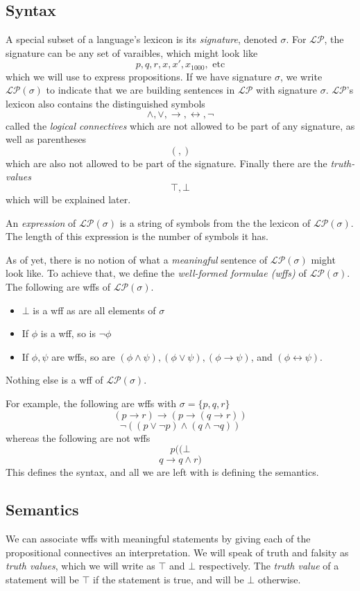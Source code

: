 \documentclass[12pt]{article}
\begin{document}
\subsection*{Syntax}
A special subset of a language's lexicon is its \emph{signature}, denoted $\sigma$. For $\mathcal{LP}$, the signature can be any set of varaibles, which might look like
\[
  p, q, r, x, x', x_{1000}, \text{ etc}
\]
which we will use to express propositions. If we have signature $\sigma$, we write $\mathcal{LP}(\sigma)$ to indicate that we are building sentences in $\mathcal{LP}$ with signature $\sigma$. $\mathcal{LP}$'s lexicon also contains the distinguished symbols
\[
  \land, \vee, \rightarrow,  \leftrightarrow, \lnot
\]
called the \emph{logical connectives} which are not allowed to be part of any signature, as well as parentheses 
\[
  (, )
\]
which are also not allowed to be part of the signature. Finally there are the \emph{truth-values}
\[
  \top, \bot
\]
which will be explained later. 

An \emph{expression} of $\mathcal{LP}(\sigma)$ is a string of symbols from the the lexicon of $\mathcal{LP}(\sigma)$. The length of this expression is the number of symbols it has. 

As of yet, there is no notion of what a \emph{meaningful} sentence of $\mathcal{LP}(\sigma)$ might look like. To achieve that, we define the \emph{well-formed formulae (wffs)} of $\mathcal{LP}(\sigma)$. The following are wffs of $\mathcal{LP}(\sigma)$. 
\begin{itemize}
  \item $\bot$ is a wff as are all elements of $\sigma$
  \item If $\phi$ is a wff, so is $\lnot \phi$
  \item If $\phi, \psi$ are wffs, so are $(\phi \land \psi), (\phi \vee \psi), (\phi \rightarrow \psi)$, and $(\phi \leftrightarrow \psi)$.
\end{itemize}
Nothing else is a wff of $\mathcal{LP}(\sigma)$. 

For example, the following are wffs with $\sigma = \{p, q, r\}$
\[
  (p \rightarrow r) \rightarrow (p \rightarrow (q \rightarrow r))
\]
\[
  \lnot((p \vee \lnot p) \land (q \land \lnot q))
\]
whereas the following are not wffs
\[
  p((\bot
\]
\[
  q \rightarrow q \land r)
\]
This defines the syntax, and all we are left with is defining the semantics. 

\subsection*{Semantics}
We can associate wffs with meaningful statements by giving each of the propositional connectives an interpretation. We will speak of truth and falsity as \emph{truth values}, which we will write as $\top$ and $\bot$ respectively. The \emph{truth value} of a statement will be $\top$ if the statement is true, and will be $\bot$ otherwise. 
\end{document}
